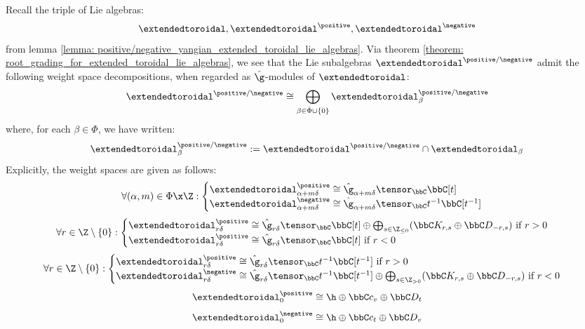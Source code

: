         \begin{corollary} \label{coro: root_grading_on_positive_and_negative_extended_toroidal_lie_algebras}
            Recall the triple of Lie algebras:
                $$\extendedtoroidal, \extendedtoroidal^{\positive}, \extendedtoroidal^{\negative}$$
            from lemma \ref{lemma: positive/negative_yangian_extended_toroidal_lie_algebras}. Via theorem \ref{theorem: root_grading_for_extended_toroidal_lie_algebras}, we see that the Lie subalgebras $\extendedtoroidal^{\positive/\negative}$ admit the following weight space decompositions, when regarded as $\hat{\g}$-modules of $\extendedtoroidal$:
                $$\extendedtoroidal^{\positive/\negative} \cong \bigoplus_{\beta \in \hat{\Phi} \cup \{0\}} \extendedtoroidal^{\positive/\negative}_{\beta}$$
            where, for each $\beta \in \hat{\Phi}$, we have written:
                $$\extendedtoroidal^{\positive/\negative}_{\beta} := \extendedtoroidal^{\positive/\negative} \cap \extendedtoroidal_{\beta}$$
            Explicitly, the weight spaces are given as follows:
                $$
                    \forall (\alpha, m) \in \Phi \x \Z:
                    \begin{cases}
                        \extendedtoroidal^{\positive}_{\alpha + m\delta} \cong \hat{\g}_{\alpha + m\delta} \tensor_{\bbC} \bbC[t]
                        \\
                        \extendedtoroidal^{\negative}_{\alpha + m\delta} \cong \hat{\g}_{\alpha + m\delta} \tensor_{\bbC} t^{-1}\bbC[t^{-1}]
                    \end{cases}
                $$
                $$
                    \forall r \in \Z \setminus \{0\}:
                    \begin{cases}
                        \text{$\extendedtoroidal^{\positive}_{r\delta} \cong \hat{\g}_{r\delta} \tensor_{\bbC} \bbC[t] \oplus \bigoplus_{s \in \Z_{\leq 0}} (\bbC K_{r, s} \oplus \bbC D_{-r, s})$ if $r > 0$}
                        \\
                        \text{$\extendedtoroidal^{\positive}_{r\delta} \cong \hat{\g}_{r\delta} \tensor_{\bbC} \bbC[t]$ if $r < 0$}
                    \end{cases}
                $$
                $$
                    \forall r \in \Z \setminus \{0\}:
                    \begin{cases}
                        \text{$\extendedtoroidal^{\positive}_{r\delta} \cong \hat{\g}_{r\delta} \tensor_{\bbC} t^{-1}\bbC[t^{-1}]$ if $r > 0$}
                        \\
                        \text{$\extendedtoroidal^{\negative}_{r\delta} \cong \hat{\g}_{r\delta} \tensor_{\bbC} t^{-1}\bbC[t^{-1}] \oplus \bigoplus_{s \in \Z_{> 0}} (\bbC K_{r, s} \oplus \bbC D_{-r, s})$ if $r < 0$}
                    \end{cases}
                $$
                $$\extendedtoroidal^{\positive}_0 \cong \h \oplus \bbC c_v \oplus \bbC D_t$$
                $$\extendedtoroidal^{\negative}_0 \cong \h \oplus \bbC c_t \oplus \bbC D_v$$
        \end{corollary}
        
